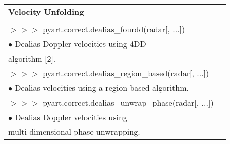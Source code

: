 \documentclass[potrait,a0paper,fontscale=0.33]{baposter} %
\begin{document}
\begin{poster}
{\begin{flushleft}
\begin{tabular}{@{}ll@{}}
\end{tabular}

\begin{tabular}{@{}ll@{}}
\\
\multicolumn{2}{l}{\cellcolor[HTML]{DDFFFF}\bf Velocity Unfolding} \\
\\
$>$$>$$>$ pyart.correct.dealias\_fourdd(radar[, ...])\\
\-\hspace{0.4cm} $\bullet$ Dealias Doppler velocities using 4DD\\
\-\hspace{0.7cm} algorithm [2].\\
$>$$>$$>$ pyart.correct.dealias\_region\_based(radar[, ...])\\
\-\hspace{0.4cm} $\bullet$ Dealias velocities using a region based algorithm.\\
$>$$>$$>$ pyart.correct.dealias\_unwrap\_phase(radar[, ...])\\
\-\hspace{0.4cm} $\bullet$ Dealias Doppler velocities using\\
\-\hspace{0.7cm} multi-dimensional phase unwrapping.\\
\end{tabular}


\end{flushleft}}
\end{poster}
\end{document}

